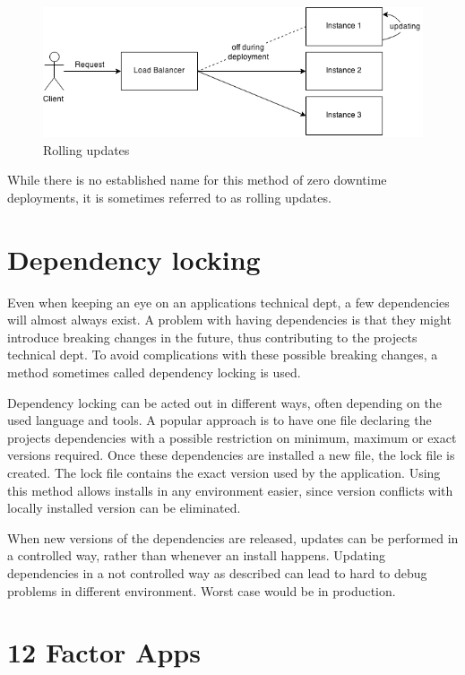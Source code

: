 \begin{figure}
  \includegraphics[scale=0.55]{pictures/rolling_updates.png}
  \caption{Rolling updates}
  \centering
  \label{fig:rollgin_updates}
\end{figure}

While there is no established name for this method of zero downtime
deployments, it is sometimes referred to as rolling updates.

\section{Dependency locking}

Even when keeping an eye on an applications technical dept, a few dependencies
will almost always exist. A problem with having dependencies is that they might
introduce breaking changes in the future, thus contributing to the projects
technical dept. To avoid complications with these possible breaking changes, a
method sometimes called dependency locking is used.

Dependency locking can be acted out in different ways, often depending on the
used language and tools. A popular approach is to have one file declaring the
projects dependencies with a possible restriction on minimum, maximum or exact
versions required. Once these dependencies are installed a new file, the lock
file is created. The lock file contains the exact version used by the
application. Using this method allows installs in any environment easier, since
version conflicts with locally installed version can be eliminated.

When new versions of the dependencies are released, updates can be performed in
a controlled way, rather than whenever an install happens. Updating
dependencies in a not controlled way as described can lead to hard to debug
problems in different environment. Worst case would be in production.

\section{12 Factor Apps}


